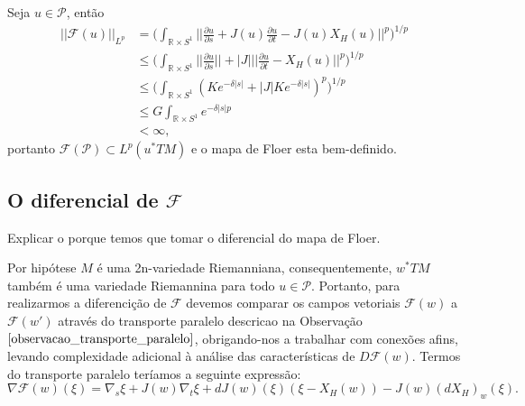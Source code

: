 \documentclass[12pt]{book}
\newcommand{\caminhosexponenciaisconectantesabrev}{\mathcal{P}}
\newcommand{\circulo}{S^{1}}
\newcommand{\derivadaparcial}[2]{\frac{\partial #1}{\partial #2}}
\newcommand{\mapafloer}{\mathcal{F}}
\newcommand{\mapafloerdefinicao}[1]{\derivadaparcial{#1}{s} + J(#1)\derivadaparcial{#1}{t} - J(#1)X_{H}(#1)}
\newcommand{\mapafloerparametro}[1]{\mathcal{F}(#1)}
\newcommand{\mapafloerpadrao}{\mapafloerparametro{u}}
\newcommand{\normagrande}[1]{\Big|\Big|#1\Big|\Big|}
\newcommand{\normaLp}[1]{||#1||_{L^{p}}}
\newcommand{\normaLpdefinicao}[2]{ \Big(\int_{#2}#1^{p}\Big)^{1/p}}
\newcommand{\normagrandeLpdefinicao}[2]{ \normaLpdefinicao{\normagrande{#1}}{#2}}
\newcommand{\pullbackfibradotangente}[2]{#1^{*}T#2}
\newcommand{\pullbackfibradotangenteM}[1]{\pullbackfibradotangente{#1}{M}}
\newcommand{\pullbackfibradotangenteMpadrao}{\pullbackfibradotangente{u}{M}}
\newcommand{\retacartesianocirculo}{\real{} \times \circulo}
\newcommand{\real}[1]{\mathbb{R}^{#1}}
\newcommand{\vermelho}[1]{{\color{red}#1}}
\begin{document}
	Seja $u \in \caminhosexponenciaisconectantesabrev$, então
	$$
	\begin{aligned}
	\normaLp{\mapafloerpadrao} &= \normagrandeLpdefinicao{\mapafloerdefinicao{u}}{\retacartesianocirculo}
	\\
	&\leq \normaLpdefinicao{\normagrande{\derivadaparcial{u}{s}} +|J|\normagrande{\derivadaparcial{u}{t} - X_{H}(u)}}{\retacartesianocirculo}
	\\
	&\leq \normaLpdefinicao{(Ke^{-\delta|s|} +|J|Ke^{-\delta|s|})}{\retacartesianocirculo}
	\\
	&\leq G \int_{\retacartesianocirculo}e^{-\delta|s|p}
	\\
	&< \infty,
	\end{aligned}	
	$$ 
	portanto $\mapafloerparametro{\caminhosexponenciaisconectantesabrev} \subset L^{p}(\pullbackfibradotangenteMpadrao)$ e o mapa de Floer esta bem-definido.
	
	\subsection{O diferencial de $\mapafloer$}
	\vermelho{Explicar o porque temos que tomar o diferencial do mapa de Floer.}
	

	
	Por hipótese $M$ é uma 2n-variedade Riemanniana, consequentemente, $\pullbackfibradotangenteM{w}$ também é uma variedade Riemannina para todo $u \in \caminhosexponenciaisconectantesabrev$. Portanto, para realizarmos a diferencição de $\mapafloer$ devemos comparar os campos vetoriais $\mapafloerparametro{w}$ a $\mapafloerparametro{w'}$ através do transporte paralelo descricao na Observação $\ref{observacao_transporte_paralelo}$, obrigando-nos a trabalhar com conexões afins, levando complexidade adicional à análise das características de $D\mapafloer(w)$. Termos do transporte paralelo teríamos a seguinte expressão:
	$$
	\nabla\mapafloerparametro{w}(\xi) = \nabla_{s}\xi + J(w)\nabla_{t}\xi + dJ(w)(\xi)(\xi - X_{H}(w)) - J(w)(dX_{H})_{w}(\xi).
	$$ 
	
\end{document}
